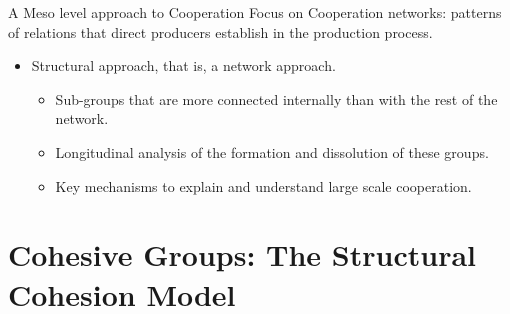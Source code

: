 \documentclass[ignorenonframetext,red,8pt,notes=hide]{beamer}
\begin{document}
\begin{frame}[label=]
\begin{columns}[c]
\begin{column}{0.5\textwidth}
\end{column}
\end{columns}

\pause

\begin{block}{A Meso level approach to Cooperation}
Focus on Cooperation networks: patterns of relations that direct producers establish in the production process.
\begin{itemize}

\item Structural approach, that is, a network approach.

\begin{itemize}

\item Sub-groups that are more connected internally than with the rest of the network. 
\item Longitudinal analysis of the formation and dissolution of these groups.
\item Key mechanisms to explain and understand large scale cooperation.

\end{itemize}
\end{itemize}
\end{block}

\end{frame}


\section{Cohesive Groups: The Structural Cohesion Model}
\end{document}
